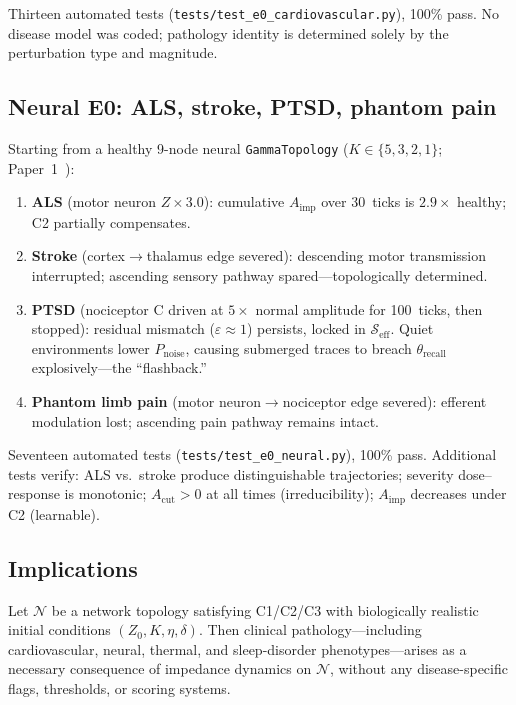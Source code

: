 \documentclass[aps,pre,twocolumn,superscriptaddress,floatfix]{revtex4-2}
\begin{document}
\noindent
Thirteen automated tests
(\texttt{tests/test\_e0\_cardiovascular.py}),
100\% pass.
No disease model was coded; pathology identity is
determined solely by the perturbation type and
magnitude.


\subsection{Neural E0: ALS, stroke, PTSD,
  phantom pain}
\label{sec:neural-e0}

Starting from a healthy 9-node neural
\texttt{GammaTopology}
($K \in \{5, 3, 2, 1\}$;
Paper~1~\cite{Paper1}):

\begin{enumerate}
  \item \textbf{ALS} (motor neuron $Z \times 3.0$):
    cumulative $A_{\text{imp}}$ over 30~ticks is
    $2.9\times$ healthy;
    C2 partially compensates.
  \item \textbf{Stroke} (cortex$\to$thalamus edge
    severed): descending motor transmission
    interrupted; ascending sensory pathway
    spared---topologically determined.
  \item \textbf{PTSD} (nociceptor C driven at
    $5\times$ normal amplitude for 100~ticks,
    then stopped): residual mismatch
    ($\varepsilon \approx 1$) persists, locked
    in $\mathcal{S}_{\text{eff}}$.
    Quiet environments lower $P_{\text{noise}}$,
    causing submerged traces to breach
    $\theta_{\text{recall}}$
    explosively---the ``flashback.''
  \item \textbf{Phantom limb pain}
    (motor neuron$\to$nociceptor edge severed):
    efferent modulation lost; ascending pain
    pathway remains intact.
\end{enumerate}

\noindent
Seventeen automated tests
(\texttt{tests/test\_e0\_neural.py}), 100\% pass.
Additional tests verify: ALS vs.\ stroke produce
distinguishable trajectories; severity dose--response
is monotonic; $A_{\text{cut}} > 0$ at all times
(irreducibility); $A_{\text{imp}}$ decreases under
C2 (learnable).


\subsection{Implications}
\label{sec:e0-implications}

\begin{theorem}[E0 Emergence]
\label{thm:e0-emergence}
Let $\mathcal{N}$ be a network topology satisfying C1/C2/C3
with biologically realistic initial conditions
$(Z_0, K, \eta, \delta)$.
Then clinical pathology---including cardiovascular,
neural, thermal, and sleep-disorder phenotypes---arises
as a necessary consequence of impedance dynamics
on $\mathcal{N}$, without any disease-specific flags,
thresholds, or scoring systems.
\end{theorem}
\end{document}
